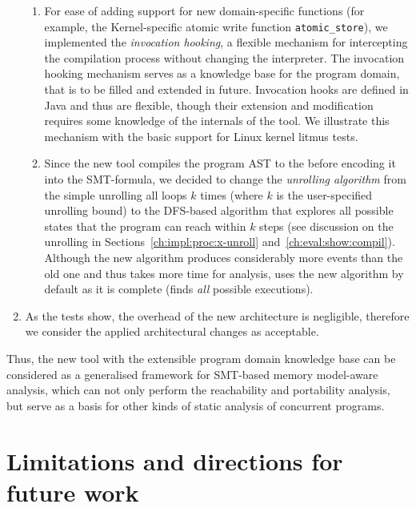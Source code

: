 \begin{enumerate}[label=\arabic*.]
\begin{enumerate}[leftmargin=\parindent,label=\alph*.]
  \item For ease of adding support for new domain-specific functions (for example, the Kernel-specific atomic write function \texttt{atomic\_store}), we implemented the \textit{invocation hooking}, a flexible mechanism for intercepting the compilation process without changing the interpreter.
  The invocation hooking mechanism serves as a knowledge base for the program domain, that is to be filled and extended in future.
  Invocation hooks are defined in Java and thus are flexible, though their extension and modification requires some knowledge of the internals of the tool.
  We illustrate this mechanism with the basic support for Linux kernel litmus tests.
  
  \item Since the new tool compiles the program AST to the \xgraph{} before encoding it into the SMT-formula, we decided to change the \textit{unrolling algorithm} from the simple unrolling all loops $k$ times (where $k$ is the user-specified unrolling bound) to the DFS-based algorithm that explores all possible states that the program can reach within $k$ steps (see discussion on the unrolling in Sections~\ref{ch:impl:proc:x-unroll} and~\ref{ch:eval:show:compil}).
  Although the new algorithm produces considerably more events than the old one and thus takes more time for analysis,  \porthos[2] uses the new algorithm by default as it is complete (finds \textit{all} possible executions).

  \end{enumerate}
  
\item 
As the tests show, the overhead of the new architecture is negligible, therefore we consider the applied architectural changes as acceptable.

\end{enumerate}

Thus, the new tool \porthos[2] with the extensible program domain knowledge base can be considered as a generalised framework for SMT-based memory model-aware analysis, which can not only perform the reachability and portability analysis, but serve as a basis for other kinds of static analysis of concurrent programs.



\section{Limitations and directions for future work}

